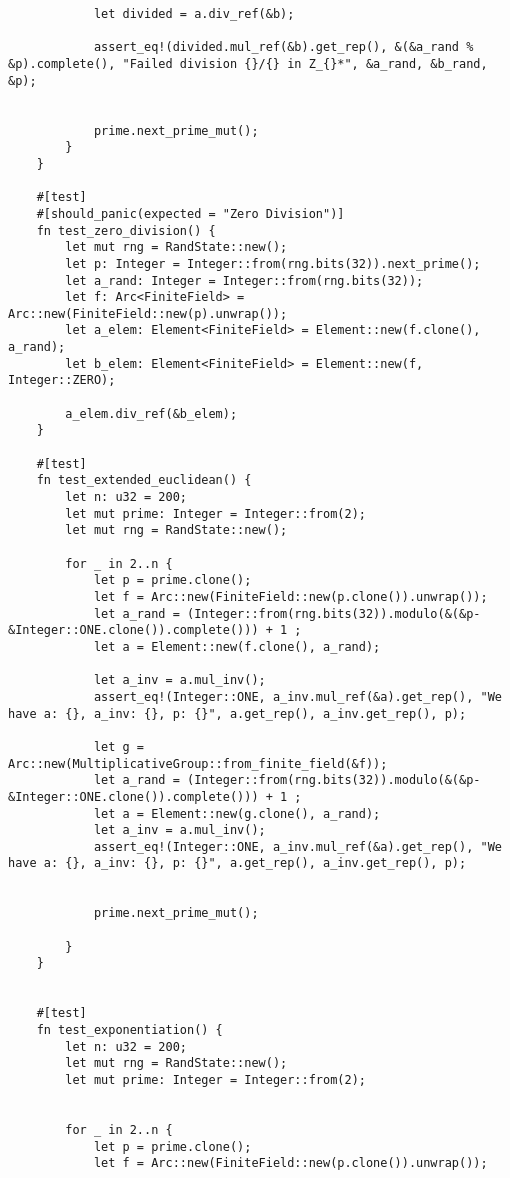 \begin{verbatim}
            let divided = a.div_ref(&b);

            assert_eq!(divided.mul_ref(&b).get_rep(), &(&a_rand % &p).complete(), "Failed division {}/{} in Z_{}*", &a_rand, &b_rand, &p);


            prime.next_prime_mut();
        }
    }

    #[test]
    #[should_panic(expected = "Zero Division")]
    fn test_zero_division() {
        let mut rng = RandState::new();
        let p: Integer = Integer::from(rng.bits(32)).next_prime();
        let a_rand: Integer = Integer::from(rng.bits(32));
        let f: Arc<FiniteField> = Arc::new(FiniteField::new(p).unwrap());
        let a_elem: Element<FiniteField> = Element::new(f.clone(), a_rand);
        let b_elem: Element<FiniteField> = Element::new(f, Integer::ZERO);

        a_elem.div_ref(&b_elem);
    }

    #[test]
    fn test_extended_euclidean() {
        let n: u32 = 200;
        let mut prime: Integer = Integer::from(2);
        let mut rng = RandState::new();

        for _ in 2..n {
            let p = prime.clone();
            let f = Arc::new(FiniteField::new(p.clone()).unwrap());
            let a_rand = (Integer::from(rng.bits(32)).modulo(&(&p-&Integer::ONE.clone()).complete())) + 1 ;
            let a = Element::new(f.clone(), a_rand);

            let a_inv = a.mul_inv();
            assert_eq!(Integer::ONE, a_inv.mul_ref(&a).get_rep(), "We have a: {}, a_inv: {}, p: {}", a.get_rep(), a_inv.get_rep(), p);

            let g = Arc::new(MultiplicativeGroup::from_finite_field(&f));
            let a_rand = (Integer::from(rng.bits(32)).modulo(&(&p-&Integer::ONE.clone()).complete())) + 1 ;
            let a = Element::new(g.clone(), a_rand);
            let a_inv = a.mul_inv();
            assert_eq!(Integer::ONE, a_inv.mul_ref(&a).get_rep(), "We have a: {}, a_inv: {}, p: {}", a.get_rep(), a_inv.get_rep(), p);


            prime.next_prime_mut();

        }
    }


    #[test]
    fn test_exponentiation() {
        let n: u32 = 200;
        let mut rng = RandState::new();
        let mut prime: Integer = Integer::from(2);


        for _ in 2..n {
            let p = prime.clone();
            let f = Arc::new(FiniteField::new(p.clone()).unwrap());


\end{verbatim}
